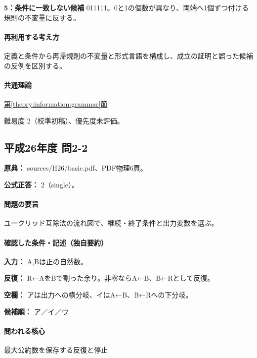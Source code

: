 \noindent\textbf{5：条件に一致しない候補} 011111。0と1の個数が異なり、両端へ1個ずつ付ける規則の不変量に反する。\par

\paragraph{再利用する考え方} 定義と条件から再帰規則の不変量と形式言語を構成し、成立の証明と誤った候補の反例を区別する。

\paragraph{共通理論} \hyperref[theory:information:grammar]{第\ref*{theory:information:grammar}節}

\par 難易度 2（校準初稿）、優先度未評価。

\subsection{平成26年度 問2-2}
\label{q:h26-reg-basic-2-2}

\noindent\textbf{原典：} sources/H26/basic.pdf、PDF物理6頁。

\textbf{公式正答：} 2（single）。

\paragraph{問題の要旨} ユークリッド互除法の流れ図で、継続・終了条件と出力変数を選ぶ。

\paragraph{確認した条件・記述（独自要約）}\mbox{}\par

\noindent\textbf{入力：} A,Bは正の自然数。\par

\noindent\textbf{反復：} R←AをBで割った余り。非零ならA←B、B←Rとして反復。\par

\noindent\textbf{空欄：} アは出力への横分岐、イはA←B、B←Rへの下分岐。\par

\noindent\textbf{候補順：} ア／イ／ウ\par

\paragraph{問われる核心} 最大公約数を保存する反復と停止

